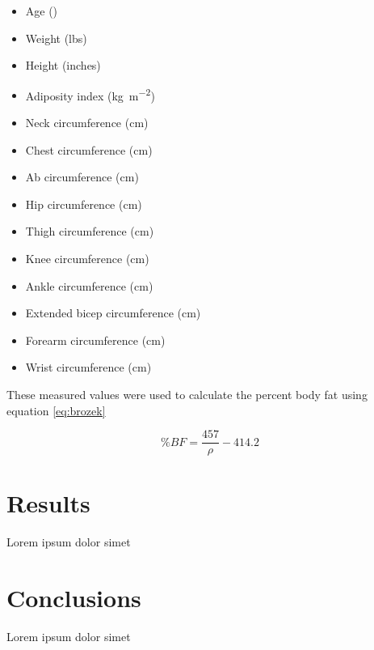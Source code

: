 \documentclass{IEEEtran}
\begin{document}
\begin{itemize}
	\item Age (\si{\year})
	\item Weight (lbs)
	\item Height (inches)
	\item Adiposity index (\si{\kilo\gram\per\meter^2})
	\item Neck circumference (\si{\centi\meter})
	\item Chest circumference (\si{\centi\meter})
	\item Ab circumference (\si{\centi\meter})
	\item Hip circumference (\si{\centi\meter})
	\item Thigh circumference (\si{\centi\meter})
	\item Knee circumference (\si{\centi\meter})
	\item Ankle circumference (\si{\centi\meter})
	\item Extended bicep circumference (\si{\centi\meter})
	\item Forearm circumference (\si{\centi\meter})
	\item Wrist circumference (\si{\centi\meter})
\end{itemize}

These measured values were used to calculate the percent body fat using equation \ref{eq:brozek}

\begin{equation}
	\%BF = \frac{457}{\rho} - 414.2
	\label{eq:brozek}
\end{equation}

\section{Results}
Lorem ipsum dolor simet

\section{Conclusions}
Lorem ipsum dolor simet

\nocite{*}
\printbibliography
\end{document}
